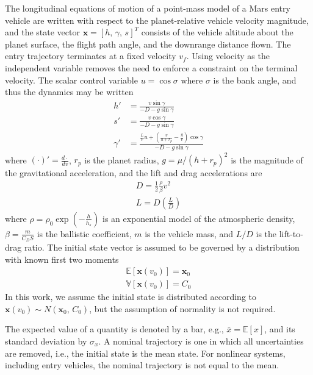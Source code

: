 \documentclass[journal ]{new-aiaa}
\newcommand{\state}{\ensuremath{\mathbf{x}}}
\newcommand{\E}[1]{\mathbb{E}\left[#1\right]}
\newcommand{\V}[1]{\mathbb{V}[#1]}
\newcommand{\cov}{C}
\begin{document}
The longitudinal equations of motion of a point-mass model of a Mars entry vehicle are written with respect to the planet-relative vehicle velocity magnitude, and the state vector $\state=[h,\,\gamma,\, s]^T$ consists of the vehicle altitude about the planet surface, the flight path angle, and the downrange distance flown. The entry trajectory terminates at a fixed velocity $v_f$. Using velocity as the independent variable removes the need to enforce a constraint on the terminal velocity. The scalar control variable $u=\cos\sigma$ where $\sigma$ is the bank angle, and thus the dynamics may be written
\begin{align}
h' &= \frac{v\sin\gamma}{-D - g\sin\gamma} \label{eq_dynamics_altitude}\\
s' &= \frac{v\cos\gamma}{-D - g\sin\gamma} \\
\gamma' &= \frac{\frac{L}{V}u + \left(\frac{v}{h+r_p}-\frac{g}{v}\right)\cos\gamma}{-D - g\sin\gamma} \label{eq_dynamics_fpa}
\end{align}
where $(\cdot)' = \frac{d\cdot}{dv}$, $r_p$ is the planet radius, $g=\mu/(h+r_p)^2$ is the magnitude of the gravitational acceleration, and the lift and drag accelerations are
\begin{align}
D = \frac{1}{2}\frac{\rho}{\beta} v^2 \\
L = D(\frac{L}{D})
\end{align}
where $\rho=\rho_0\exp\left(-\frac{h}{h_s}\right)$ is an exponential model of the atmospheric density, $\beta=\frac{m}{C_DS}$ is the ballistic coefficient, $m$ is the vehicle mass, and $L/D$ is the lift-to-drag ratio.
The initial state vector is assumed to be governed by a distribution with known first two moments
 \begin{align}
 \E{\state(v_0)} = \state_0 \label{eq_ic_mean}\\ 
 \V{\state(v_0)} = \cov_0 \label{eq_ic_cov}
 \end{align}
In this work, we assume the initial state is distributed according to $\state(v_0)\sim N(\state_0,\,\cov_0)$, but the assumption of normality is not required. 

The expected value of a quantity is denoted by a bar, e.g., $\bar{x}=\E{x}$, and its standard deviation by $\sigma_{x}$. A nominal trajectory is one in which all uncertainties are removed, i.e., the initial state is the mean state. For nonlinear systems, including entry vehicles, the nominal trajectory is not equal to the mean.
\end{document}

